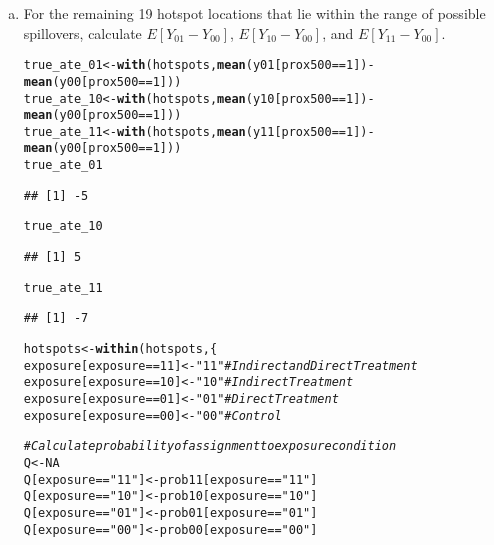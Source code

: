 \documentclass[11pt,notitlepage]{article}\usepackage[]{graphicx}\usepackage[]{color}
\makeatletter
\newcommand{\hlnum}[1]{\textcolor[rgb]{0.686,0.059,0.569}{#1}}%
\newcommand{\hlstr}[1]{\textcolor[rgb]{0.192,0.494,0.8}{#1}}%
\newcommand{\hlcom}[1]{\textcolor[rgb]{0.678,0.584,0.686}{\textit{#1}}}%
\newcommand{\hlopt}[1]{\textcolor[rgb]{0,0,0}{#1}}%
\newcommand{\hlstd}[1]{\textcolor[rgb]{0.345,0.345,0.345}{#1}}%
\newcommand{\hlkwb}[1]{\textcolor[rgb]{0.69,0.353,0.396}{#1}}%
\newcommand{\hlkwd}[1]{\textcolor[rgb]{0.737,0.353,0.396}{\textbf{#1}}}%
\newenvironment{kframe}{%
 \def\at@end@of@kframe{}%
 \ifinner\ifhmode%
  \def\at@end@of@kframe{\end{minipage}}%
  \begin{minipage}{\columnwidth}%
 \fi\fi%
 \def\FrameCommand##1{\hskip\@totalleftmargin \hskip-\fboxsep
 \colorbox{shadecolor}{##1}\hskip-\fboxsep
     \hskip-\linewidth \hskip-\@totalleftmargin \hskip\columnwidth}%
 \MakeFramed {\advance\hsize-\width
   \@totalleftmargin\z@ \linewidth\hsize
   \@setminipage}}%
 {\par\unskip\endMakeFramed%
 \at@end@of@kframe}
\newenvironment{knitrout}{}{} %
\makeatother
\begin{document}
\begin{enumerate}[a)]
\item For the remaining 19 hotspot locations that lie within the range of possible spillovers, calculate $E[Y_{01} - Y_{00}]$, $E[Y_{10} - Y_{00}]$, and $E[Y_{11} - Y_{00}]$.
\begin{knitrout}
\color{fgcolor}\begin{kframe}
\begin{alltt}
\hlstd{true_ate_01} \hlkwb{<-} \hlkwd{with}\hlstd{(hotspots,} \hlkwd{mean}\hlstd{(y01[prox500}\hlopt{==}\hlnum{1}\hlstd{])} \hlopt{-} \hlkwd{mean}\hlstd{(y00[prox500}\hlopt{==}\hlnum{1}\hlstd{]))}
\hlstd{true_ate_10} \hlkwb{<-} \hlkwd{with}\hlstd{(hotspots,} \hlkwd{mean}\hlstd{(y10[prox500}\hlopt{==}\hlnum{1}\hlstd{])} \hlopt{-} \hlkwd{mean}\hlstd{(y00[prox500}\hlopt{==}\hlnum{1}\hlstd{]))}
\hlstd{true_ate_11} \hlkwb{<-} \hlkwd{with}\hlstd{(hotspots,} \hlkwd{mean}\hlstd{(y11[prox500}\hlopt{==}\hlnum{1}\hlstd{])} \hlopt{-} \hlkwd{mean}\hlstd{(y00[prox500}\hlopt{==}\hlnum{1}\hlstd{]))}
\hlstd{true_ate_01}
\end{alltt}
\begin{verbatim}
## [1] -5
\end{verbatim}
\begin{alltt}
\hlstd{true_ate_10}
\end{alltt}
\begin{verbatim}
## [1] 5
\end{verbatim}
\begin{alltt}
\hlstd{true_ate_11}
\end{alltt}
\begin{verbatim}
## [1] -7
\end{verbatim}
\begin{alltt}
\hlstd{hotspots} \hlkwb{<-} \hlkwd{within}\hlstd{(hotspots,\{}
  \hlstd{exposure[exposure} \hlopt{==} \hlnum{11}\hlstd{]} \hlkwb{<-} \hlstr{"11"}  \hlcom{# Indirect and Direct Treatment}
  \hlstd{exposure[exposure} \hlopt{==} \hlnum{10}\hlstd{]} \hlkwb{<-} \hlstr{"10"}  \hlcom{# Indirect Treatment}
  \hlstd{exposure[exposure} \hlopt{==} \hlnum{01}\hlstd{]} \hlkwb{<-} \hlstr{"01"}  \hlcom{# Direct Treatment}
  \hlstd{exposure[exposure} \hlopt{==} \hlnum{00}\hlstd{]} \hlkwb{<-} \hlstr{"00"}  \hlcom{# Control}

  \hlcom{# Calculate probability of assignment to exposure condition}
  \hlstd{Q} \hlkwb{<-} \hlnum{NA}
  \hlstd{Q[exposure} \hlopt{==} \hlstr{"11"}\hlstd{]} \hlkwb{<-} \hlstd{prob11[exposure} \hlopt{==} \hlstr{"11"}\hlstd{]}
  \hlstd{Q[exposure} \hlopt{==} \hlstr{"10"}\hlstd{]} \hlkwb{<-} \hlstd{prob10[exposure} \hlopt{==} \hlstr{"10"}\hlstd{]}
  \hlstd{Q[exposure} \hlopt{==} \hlstr{"01"}\hlstd{]} \hlkwb{<-} \hlstd{prob01[exposure} \hlopt{==} \hlstr{"01"}\hlstd{]}
  \hlstd{Q[exposure} \hlopt{==} \hlstr{"00"}\hlstd{]} \hlkwb{<-} \hlstd{prob00[exposure} \hlopt{==} \hlstr{"00"}\hlstd{]}


\end{alltt}
\end{kframe}
\end{knitrout}
\end{enumerate}
\end{document}
